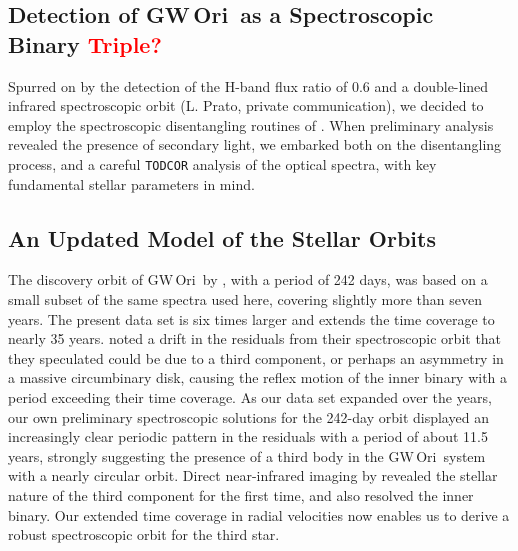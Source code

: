 \documentclass[twocolumn]{aastex61}
\newcommand{\todo}[1]{ \textcolor{red}{#1}}
\newcommand{\gw}{GW\,Ori}
\begin{document}




\subsection{Detection of \gw\ as a Spectroscopic Binary \todo{Triple?}}

Spurred on by the detection of the H-band flux ratio of 0.6 \citep{berger11} and a double-lined infrared spectroscopic orbit (L. Prato, private communication), we decided to employ the spectroscopic disentangling routines of \citep{czekala17}. When preliminary analysis revealed the presence of secondary light, we embarked both on the disentangling process, and a careful \texttt{TODCOR} analysis of the optical spectra, with key fundamental stellar parameters in mind.


\subsection{An Updated Model of the Stellar Orbits} \label{sec:orbit}
The discovery orbit of \gw\ by \cite{mathieu91}, with a period of 242 days, was based on a small subset of the same spectra used here, covering slightly more than seven years. The present data set is six times larger and extends the time coverage to nearly 35 years. \cite{mathieu91} noted a drift in the residuals from their spectroscopic orbit that they speculated could be due to a third component, or perhaps an asymmetry in a massive circumbinary disk,
causing the reflex motion of the inner binary with a period exceeding their time coverage. As our data set expanded over the years, our own preliminary spectroscopic solutions for the 242-day orbit displayed an
increasingly clear periodic pattern in the residuals with a period of about 11.5 years, strongly suggesting the presence of a third body in the \gw\ system with a nearly circular orbit. Direct near-infrared
imaging by \cite{berger11} revealed the stellar nature of the third component for the first time, and also resolved the inner binary.  Our extended time coverage in radial velocities now enables us to derive a robust spectroscopic orbit for the third star.
\end{document}
